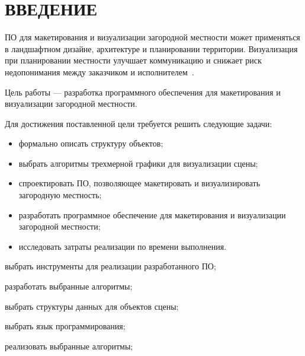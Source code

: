 \chapter*{ВВЕДЕНИЕ}

ПО для макетирования и визуализации загородной местности может применяться в ландшафтном дизайне, архитектуре и планировании территории.
Визуализация при планировании местности улучшает коммуникацию и снижает риск недопонимания между заказчиком и исполнителем~\cite{intro_visualization}.

Цель работы --- разработка программного обеспечения для макетирования и визуализации загородной местности.

Для достижения поставленной цели требуется решить следующие задачи:
\begin{itemize}
	\item формально описать структуру объектов;
	\item выбрать алгоритмы трехмерной графики для визуализации сцены;
	\item спроектировать ПО, позволяющее макетировать и визуализировать загородную местность;
	\item разработать программное обеспечение для макетирования и визуализации загородной местности;
	\item исследовать затраты реализации по времени выполнения.
\end{itemize}


\item выбрать инструменты для реализации разработанного ПО;
	\item разработать выбранные алгоритмы;
\item выбрать структуры данных для объектов сцены;
\item выбрать язык программирования;
\item реализовать выбранные алгоритмы;

\fi